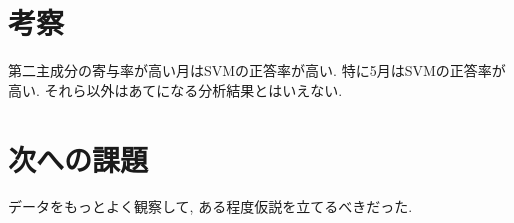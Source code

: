 \documentclass{jarticle}
\begin{document}
\hypertarget{header-n2056}{%
\section{考察}\label{header-n2056}}

第二主成分の寄与率が高い月はSVMの正答率が高い. 特に5月はSVMの正答率が高い. それら以外はあてになる分析結果とはいえない.
%

\section{次への課題}

データをもっとよく観察して, ある程度仮説を立てるべきだった. 
\end{document}

